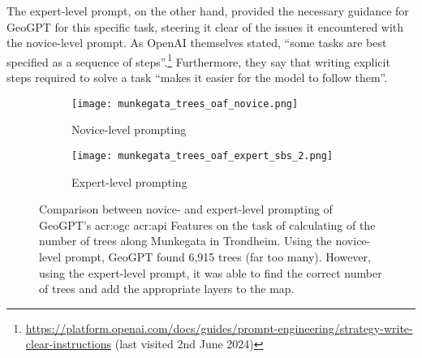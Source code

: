 The expert-level prompt, on the other hand, provided the necessary guidance for GeoGPT for this specific task, steering it clear of the issues it encountered with the novice-level prompt. As OpenAI themselves stated, \enquote{some tasks are best specified as a sequence of steps}.\footnote{\url{https://platform.openai.com/docs/guides/prompt-engineering/strategy-write-clear-instructions} (last visited 2nd June 2024)} Furthermore, they say that writing explicit steps required to solve a task \enquote{makes it easier for the model to follow them}.

\begin{figure}[htbp]
    \centering
    \begin{subfigure}[b]{0.7\textwidth}
        \centering
        \texttt{[image: munkegata\_trees\_oaf\_novice.png]}
        \caption{Novice-level prompting}
        \label{fig:novice-level-prompting-munkegata-trees}
    \end{subfigure}
    \hfill
    \begin{subfigure}[b]{0.7\textwidth}
        \centering
        \texttt{[image: munkegata\_trees\_oaf\_expert\_sbs\_2.png]}
        \caption{Expert-level prompting}
        \label{fig:expert-level-prompting-munkegata-trees}
    \end{subfigure}
    \caption[Comparison between novice- and expert-level prompting of GeoGPT for calculating the number of trees along Munkegata in Trondheim.]{Comparison between novice- and expert-level prompting of GeoGPT's \acrshort{acr:ogc} \acrshort{acr:api} Features on the task of calculating of the number of trees along Munkegata in Trondheim. Using the novice-level prompt, GeoGPT found 6,915 trees (far too many). However, using the expert-level prompt, it was able to find the correct number of trees and add the appropriate layers to the map.
    }
    \label{fig:novice-vs-expert-munkegata-trees}
\end{figure}


\glsresetall